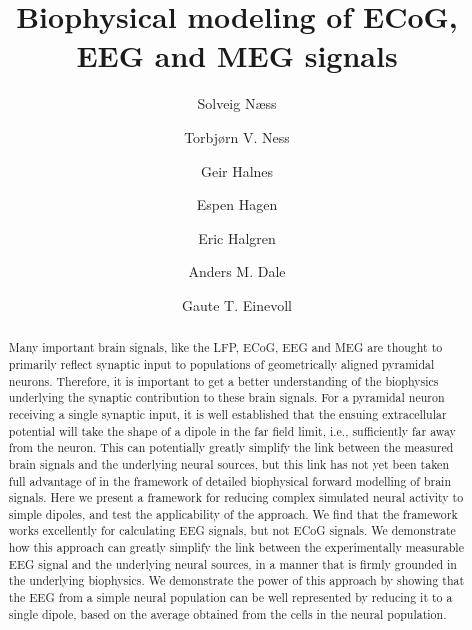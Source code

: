 \documentclass[preprint,10pt,authoryear]{elsarticle}
\begin{document}
	
\begin{frontmatter}
\linenumbers

\title{Biophysical modeling of ECoG, EEG and MEG signals}

\author{Solveig N\ae{}ss}
\author{Torbj\o{}rn V. Ness}
\author{Geir Halnes}
\author{Espen Hagen }
\author{Eric Halgren}
\author{Anders M. Dale}
\author{Gaute T. Einevoll}

\address[label1]{Department of Informatics, University of Oslo, Oslo, Norway}
\address[label2]{Department of Mathematical Sciences and Technology, Norwegian University of Life Sciences, Ås, Norway}
\address[label3]{Department of Radiology, University of California, San Diego, CA, USA}
\address[label4]{Departments of Neurosciences and Radiology, University of California, San Diego, CA, USA}
\address[label5]{Department of Physics, University of Oslo, Oslo, Norway}


\begin{abstract}
Many important brain signals, like the LFP, ECoG, EEG and MEG are thought to primarily reflect synaptic input to populations of geometrically aligned pyramidal neurons. Therefore, it is important to get a better understanding of the biophysics underlying the synaptic contribution to these brain signals. For a pyramidal neuron receiving a single synaptic input, it is well established that the ensuing extracellular potential will take the shape of a dipole in the far field limit, i.e., sufficiently far away from the neuron. This can potentially greatly simplify the link between the measured brain signals and the underlying neural sources, but this link has not yet been taken full advantage of in the framework of detailed biophysical forward modelling of brain signals. 
Here we present a framework for reducing complex simulated neural activity to simple dipoles, and test the applicability of the approach. We find that the framework works excellently for calculating EEG signals, but not ECoG signals. We demonstrate how this approach can greatly simplify the link between the experimentally measurable EEG signal and the underlying neural sources, in a manner that is firmly grounded in the underlying biophysics. We demonstrate the power of this approach by showing that the EEG from a simple neural population can be well represented by reducing it to a single dipole, based on the average obtained from the cells in the neural population.
\end{abstract}

\end{frontmatter}
\end{document}
